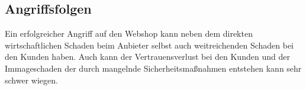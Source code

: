 \subsection{Angriffsfolgen}

Ein erfolgreicher Angriff auf den Webshop kann neben dem direkten wirtschaftlichen Schaden beim Anbieter selbst auch weitreichenden Schaden bei den Kunden haben. Auch kann der Vertrauensverlust bei den Kunden und der Immageschaden der durch mangelnde Sicherheitsmaßnahmen entstehen kann sehr schwer wiegen.